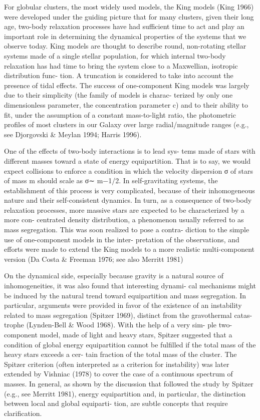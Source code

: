 \documentclass[../main.tex]{subfiles}
\begin{document}
{For globular clusters, the most widely used models, the King
models (King 1966) were developed under the guiding picture
that for many clusters, given their long age, two-body relaxation
processes have had suﬃcient time to act and play an important
role in determining the dynamical properties of the systems that
we observe today. King models are thought to describe round,
non-rotating stellar systems made of a single stellar population,
for which internal two-body relaxation has had time to bring
the system close to a Maxwellian, isotropic distribution func-
tion. A truncation is considered to take into account the presence
of tidal eﬀects. The success of one-component King models was
largely due to their simplicity (the family of models is charac-
terized by only one dimensionless parameter, the concentration
parameter c) and to their ability to fit, under the assumption of
a constant mass-to-light ratio, the photometric profiles of most
clusters in our Galaxy over large radial/magnitude ranges (e.g.,
see Djorgovski & Meylan 1994; Harris 1996).

One of the eﬀects of two-body interactions is to lead sys-
tems made of stars with diﬀerent masses toward a state of energy
equipartition. That is to say, we would expect collisions to enforce
a condition in which the velocity dispersion σ of stars of mass
m should scale as σ∼ m−1/2. In self-gravitating systems, the
establishment of this process is very complicated, because of
their inhomogeneous nature and their self-consistent dynamics.
In turn, as a consequence of two-body relaxation processes, more
massive stars are expected to be characterized by a more con-
centrated density distribution, a phenomenon usually referred to
as mass segregation. This was soon realized to pose a contra-
diction to the simple use of one-component models in the inter-
pretation of the observations, and eﬀorts were made to extend
the King models to a more realistic multi-component version
(Da Costa & Freeman 1976; see also Merritt 1981)

On the
dynamical side, especially because gravity is a natural source of
inhomogeneities, it was also found that interesting dynami-
cal mechanisms might be induced by the natural trend toward
equipartition and mass segregation. In particular, arguments were
provided in favor of the existence of an instability related to mass
segregation (Spitzer 1969), distinct from the gravothermal catas-
trophe (Lynden-Bell & Wood 1968). With the help of a very sim-
ple two-component model, made of light and heavy stars, Spitzer
suggested that a condition of global energy equipartition cannot
be fulfilled if the total mass of the heavy stars exceeds a cer-
tain fraction of the total mass of the cluster. The Spitzer criterion
(often interpreted as a criterion for instability) was later extended
by Vishniac (1978) to cover the case of a continuous spectrum of
masses. In general, as shown by the discussion that followed the
study by Spitzer (e.g., see Merritt 1981), energy equipartition and,
in particular, the distinction between local and global equiparti-
tion, are subtle concepts that require clarification.

}
\end{document}
